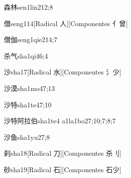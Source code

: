 \begin{verbete}{森林}{sen1lin2}{12;8}
\end{verbete}

\begin{verbete}{僧}{seng1}{14}[Radical 人][Componentes 亻曾]
\end{verbete}

\begin{verbete}{僧伽}{seng1qie2}{14;7}
\end{verbete}

\begin{verbete}{杀气}{sha1qi4}{6;4}
\end{verbete}

\begin{verbete}{沙}{sha1}{7}[Radical 水][Componentes 氵少]
\end{verbete}

\begin{verbete}{沙漠}{sha1mo4}{7;13}
\end{verbete}

\begin{verbete}{沙特}{sha1te4}{7;10}
\end{verbete}

\begin{verbete}{沙特阿拉伯}{sha1te4 a1la1bo2}{7;10;7;8;7}
\end{verbete}

\begin{verbete}{沙鱼}{sha1yu2}{7;8}
\end{verbete}

\begin{verbete}{刹}{sha1}{8}[Radical 刀][Componentes 杀刂]
\end{verbete}

\begin{verbete}{砂}{sha1}{9}[Radical 石][Componentes 石少]
\end{verbete}

